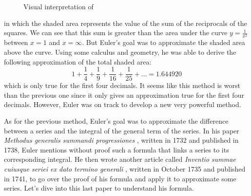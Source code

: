 \begin{figure}[h]
    \centering
    \caption{Visual interpretation of}
    \label{fig:visual sum vs integral}
\end{figure}

in which the shaded area represents the value of the sum of the reciprocals of the squares. We can see that this sum is greater than the area under the curve $y = \frac{1}{x^2}$ between $x=1$ and $x = \infty$. But Euler's goal was to approximate the shaded area above the curve. Using some calculus and geometry, he was able to derive the following approximation of the total shaded area:
$$1 + \frac{1}{4} + \frac{1}{9} + \frac{1}{16} + \frac{1}{25} + \dots = 1.644920$$
which is only true for the first four decimals. It seems like this method is worst than the previous one since it only gives an approximation true for the first four decimals. However, Euler was on track to develop a new very powerful method.

As for the previous method, Euler's goal was to approximate the difference between a series and the integral of the general term of the series. In his paper \textit{Methodus generalis summandi progressiones} \cite{eulerE25}, written in 1732 and published in 1738, Euler mentions without proof such a formula that links a series to its corresponding integral. He then wrote another article called \textit{Inventio summae cuiusque seriei ex dato termino generali} \cite{eulerE47}, written in October 1735 and published in 1741, to go over the proof of his formula and apply it to approximate some series. Let's dive into this last paper to understand his formula. 

